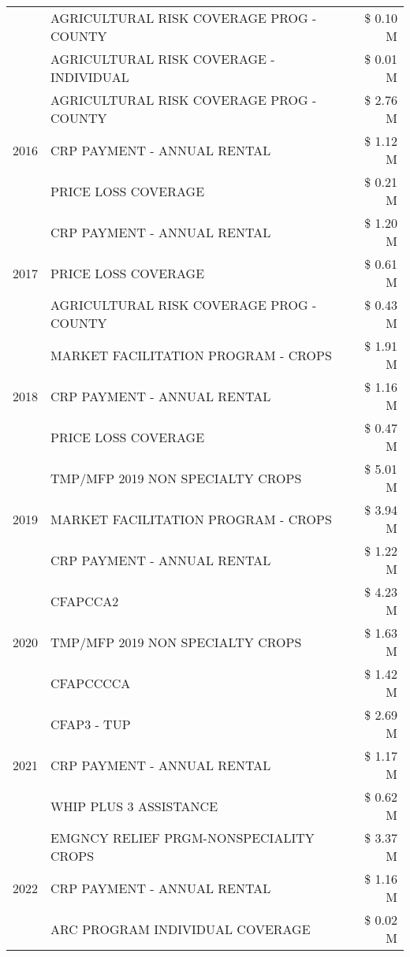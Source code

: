 \begin{tabular}{llr}
 & AGRICULTURAL RISK COVERAGE PROG - COUNTY & \$ 0.10 M \\
 & AGRICULTURAL RISK COVERAGE - INDIVIDUAL & \$ 0.01 M \\
\cline{1-3}
\multirow[t]{3}{*}{2016} & AGRICULTURAL RISK COVERAGE PROG - COUNTY & \$ 2.76 M \\
 & CRP PAYMENT - ANNUAL RENTAL & \$ 1.12 M \\
 & PRICE LOSS COVERAGE & \$ 0.21 M \\
\cline{1-3}
\multirow[t]{3}{*}{2017} & CRP PAYMENT - ANNUAL RENTAL & \$ 1.20 M \\
 & PRICE LOSS COVERAGE & \$ 0.61 M \\
 & AGRICULTURAL RISK COVERAGE PROG - COUNTY & \$ 0.43 M \\
\cline{1-3}
\multirow[t]{3}{*}{2018} & MARKET FACILITATION PROGRAM - CROPS & \$ 1.91 M \\
 & CRP PAYMENT - ANNUAL RENTAL & \$ 1.16 M \\
 & PRICE LOSS COVERAGE & \$ 0.47 M \\
\cline{1-3}
\multirow[t]{3}{*}{2019} & TMP/MFP 2019 NON SPECIALTY CROPS & \$ 5.01 M \\
 & MARKET FACILITATION PROGRAM - CROPS & \$ 3.94 M \\
 & CRP PAYMENT - ANNUAL RENTAL & \$ 1.22 M \\
\cline{1-3}
\multirow[t]{3}{*}{2020} & CFAPCCA2 & \$ 4.23 M \\
 & TMP/MFP 2019 NON SPECIALTY CROPS & \$ 1.63 M \\
 & CFAPCCCCA & \$ 1.42 M \\
\cline{1-3}
\multirow[t]{3}{*}{2021} & CFAP3 - TUP & \$ 2.69 M \\
 & CRP PAYMENT - ANNUAL RENTAL & \$ 1.17 M \\
 & WHIP PLUS 3 ASSISTANCE & \$ 0.62 M \\
\cline{1-3}
\multirow[t]{3}{*}{2022} & EMGNCY RELIEF PRGM-NONSPECIALITY CROPS & \$ 3.37 M \\
 & CRP PAYMENT - ANNUAL RENTAL & \$ 1.16 M \\
 & ARC PROGRAM INDIVIDUAL COVERAGE & \$ 0.02 M \\
\cline{1-3}
\bottomrule
\end{tabular}
